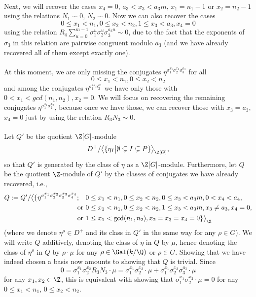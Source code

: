 \paragraph*{}
Next, we will recover the cases $x_4=0$, $a_3< x_3<a_3m$, $x_1=n_1-1$ or $x_2=n_2-1$ using the relations $N_1\sim 0$, $ N_2\sim 0$. Now we can also recover the cases $$0\leq x_1<n_1, 0\leq x_2< n_2, 1\leq x_3<a_3, x_4=0$$
using the relation $R_4\sum_{u=0}^{m-1}\sigma_1^{u}\sigma_2^{u}\sigma_3^{a_3u}\sim 0$, due to the fact that the exponents of $\sigma_3$ in this relation are pairwise congruent modulo $a_3$ (and we have already recovered all of them except exactly one).
\paragraph*{}
At this moment, we are only missing the conjugates $\eta^{\sigma_1^{x_1}\sigma_2^{x_2}\sigma_3^{a_3}}$ for all $$0\leq x_1<n_1, 0\leq x_2<n_2$$ 
and among the conjugates $\eta^{\sigma_1^{x_1}\sigma_2^{x_2}}$
we have only those with 
$0 < x_1 <gcd(n_1,n_2),  x_2 = 0$.
We will focus on recovering the remaining conjugates $\eta^{\sigma_1^{x_1}\sigma_2^{x_2}}$, 
because once we have those, we can recover those with $x_3=a_3$, $x_4=0$ just by using the relation $R_3N_3\sim 0$.

\paragraph*{}
Let $Q'$ be the quotient $\Z[G]$-module $$D^+/\big\langle \{\eta_I \big\vert \emptyset \subsetneq I \subsetneq P \}\big\rangle_{\Z[G]},$$
so that $Q'$ is generated by the class of $\eta$ as a $\Z[G]$-module. Furthermore, let $Q$ be the quotient $\Z$-module of $Q'$ by the classes of conjugates we have already recovered, i.e., %
\begin{align*}
Q:=Q'/\big\langle \{\eta^{\sigma_1^{x_1}\sigma_2^{x_2}\sigma_3^{x_3}\sigma_4^{x_4}}; \quad & 0\leq x_1< n_1, 0\leq x_2<n_2, 0\leq x_3<a_3m,0< x_4<a_4,\\
\text { or }& 0\leq x_1< n_1, 0\leq x_2<n_2, 1\leq x_3<a_3m, x_3\neq a_3, x_4=0,\\
\text { or }& 1\leq x_1<\gcd(n_1,n_2), x_2=x_3=x_4=0 \}\big\rangle_{\Z}
\end{align*}
(where we denote $\eta^{\rho}\in D^+$ and its class in $Q'$ in the same way for any $\rho\in G$).
We will write $Q$ additively, denoting the class of $\eta$ in $Q$ by $\mu$, hence denoting the class of $\eta^{\rho}$ in $Q$ by $\rho\cdot \mu$ for any $\rho\in\Gal(k/\Q)$ or $\rho\in G$.
Showing that we have indeed chosen a basis now amounts to showing that $Q$ is trivial. Since $$0=\sigma_1^{x_1}\sigma_2^{x_2}R_3N_3\cdot \mu=\sigma_1^{x_1}\sigma_2^{x_2}\cdot \mu+\sigma_1^{x_1}\sigma_2^{x_2}\sigma_3^{a_3}\cdot \mu$$
for any $x_1,x_2\in\Z$,
this is equivalent with showing that $\sigma_1^{x_1}\sigma_2^{x_2}\cdot \mu=0$ for any $0\leq x_1<n_1$, $0\leq x_2<n_2$.

